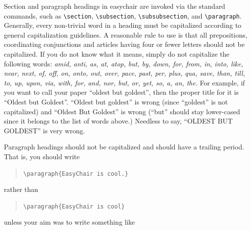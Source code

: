 \documentclass{imav2013}
\newcommand{\easychair}{\textsf{easychair}}
\begin{document}
Section and paragraph headings in {\easychair} are invoked via the standard 
commands, such as
\verb+\section+,
\verb+\subsection+,
\verb+\subsubsection+, and
\verb+\paragraph+.
Generally, every non-trivial word in a heading must be capitalized according to
general capitalization guidelines. A reasonable rule to use is that
all prepositions, coordinating conjunctions and articles having four
or fewer letters should not be capitalized. If you do not know what it
means, simply do not capitalize the following words:
\textit{amid, anti, as, at, atop, but, by, down, for, from, in, into, like,
near, next, of, off, on, onto, out, over, pace, past, per, plus, qua,
save, than, till, to, up, upon, via, with, for, and, nor, but, or,
yet, so, a, an, the.} For example, if you want to call your paper
``oldest but goldest'', then the proper title for it is ``Oldest but
Goldest''. ``Oldest but goldest'' is wrong (since ``goldest'' is not
capitalized) and ``Oldest But Goldest'' is wrong (``but'' should stay
lower-cased since it belongs to the list of words above.) Needless to
say, ``OLDEST BUT GOLDEST'' is very wrong.

Paragraph headings should not be capitalized and should have a
trailing period. That is, you should write

\begin{quote}
\verb|\paragraph{EasyChair is cool.}|
\end{quote}
rather than 

\begin{quote}
\verb|\paragraph{EasyChair is cool}|
\end{quote}
unless your aim was to write something like
\end{document}
